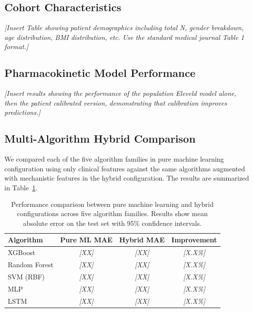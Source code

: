 \documentclass[11pt,a4paper]{article}
\newcommand{\placeholder}[1]{\textcolor{placeholdergray}{\textit{[#1]}}}
\begin{document}
\subsection{Cohort Characteristics}

\placeholder{Insert Table showing patient demographics including total
N, gender breakdown, age distribution, BMI distribution, etc. Use the
standard medical journal Table 1 format.}

\subsection{Pharmacokinetic Model Performance}

\placeholder{Insert results showing the performance of the population
Eleveld model alone, then the patient calibrated version, demonstrating
that calibration improves predictions.}

\subsection{Multi-Algorithm Hybrid Comparison}

We compared each of the five algorithm families in pure machine learning
configuration using only clinical features against the same algorithms
augmented with mechanistic features in the hybrid configuration. The
results are summarized in Table~\ref{tab:multialg}.

\begin{table}[H]
\centering
\caption{Performance comparison between pure machine learning and hybrid
configurations across five algorithm families. Results show mean absolute
error on the test set with 95\% confidence intervals.}
\label{tab:multialg}
\begin{tabular}{lccc}
\toprule
Algorithm & Pure ML MAE & Hybrid MAE & Improvement \\
\midrule
XGBoost & \placeholder{XX} & \placeholder{XX} & \placeholder{X.X\%} \\
Random Forest & \placeholder{XX} & \placeholder{XX} & \placeholder{X.X\%} \\
SVM (RBF) & \placeholder{XX} & \placeholder{XX} & \placeholder{X.X\%} \\
MLP & \placeholder{XX} & \placeholder{XX} & \placeholder{X.X\%} \\
LSTM & \placeholder{XX} & \placeholder{XX} & \placeholder{X.X\%} \\
\bottomrule
\end{tabular}
\end{table}
\end{document}
